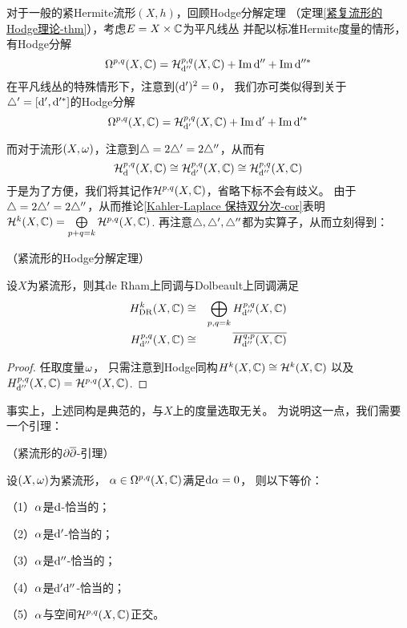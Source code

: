 对于一般的紧Hermite流形$(X,h)$，回顾Hodge分解定理
（定理\ref{紧复流形的Hodge理论-thm}），考虑$E=X\times\mathbb{C}$为平凡线丛
并配以标准Hermite度量的情形，有Hodge分解
$$
  \Omega^{p,q}(X,\mathbb{C})=
  \mathcal{H}^{p,q}_{\mathrm{d}''}(X,\mathbb{C})+\operatorname{Im}\mathrm{d}''+\operatorname{Im}\mathrm{d}''^*
$$
在平凡线丛的特殊情形下，注意到$(\mathrm{d}')^2=0$，
我们亦可类似得到关于$\triangle'=[\mathrm{d}',\mathrm{d}'^*]$的Hodge分解
$$
  \Omega^{p,q}(X,\mathbb{C})=
  \mathcal{H}^{p,q}_{\mathrm{d}'}(X,\mathbb{C})+\operatorname{Im}\mathrm{d}'+\operatorname{Im}\mathrm{d}'^*
$$

而对于\Kahler 流形$(X,\omega)$，注意到$\triangle=2\triangle'=2\triangle''$，从而有
$$
     \mathcal{H}^{p,q}_{\mathrm{d}}(X,\mathbb{C})
\cong\mathcal{H}^{p,q}_{\mathrm{d}'}(X,\mathbb{C})
\cong\mathcal{H}^{p,q}_{\mathrm{d}''}(X,\mathbb{C})
$$
于是为了方便，我们将其记作$\mathcal{H}^{p,q}(X,\mathbb{C})$，省略下标不会有歧义。
由于$\triangle=2\triangle'=2\triangle''$，从而推论\ref{Kahler-Laplace 保持双分次-cor}表明
$\mathcal{H}^{k}(X,\mathbb{C})=\bigoplus\limits_{p+q=k}\mathcal{H}^{p,q}(X,\mathbb{C})$.
再注意$\triangle,\triangle',\triangle''$都为实算子，从而立刻得到：

\begin{thm}（紧\Kahler 流形的Hodge分解定理）
\label{紧Kahler流形的Hodge分解-thm}

设$X$为紧\Kahler 流形，则其de Rham上同调与Dolbeault上同调满足
\begin{eqnarray*}
  H^k_{\operatorname{DR}}(X,\mathbb{C})&\cong&
  \bigoplus_{p,q=k}H^{p,q}_{\mathrm{d}''}(X,\mathbb{C})
\\
  H^{p,q}_{\mathrm{d}''}(X,\mathbb{C})&\cong&
  \overline{
  H^{q,p}_{\mathrm{d}''}(X,\mathbb{C})
  }
\end{eqnarray*}
\end{thm}

\begin{proof}
任取\Kahler 度量$\omega$，
只需注意到Hodge同构$H^k(X,\mathbb{C})\cong\mathcal{H}^k(X,\mathbb{C})$
以及$H^{p,q}_{\mathrm{d}''}(X,\mathbb{C})=\mathcal{H}^{p,q}(X,\mathbb{C})$.
\end{proof}

事实上，上述同构是典范的，与$X$上的\Kahler 度量选取无关。
为说明这一点，我们需要一个引理：

\begin{lemma}（紧\Kahler 流形的$\partial\overline{\partial}$-引理）
\label{紧Kahler流形的ppbar引理}

设$(X,\omega)$为紧\Kahler 流形，
$\alpha\in\Omega^{p,q}(X,\mathbb{C})$满足$\mathrm{d}\alpha=0$，
则以下等价：

（1）$\alpha$是$\mathrm{d}$-恰当的；

（2）$\alpha$是$\mathrm{d}'$-恰当的；

（3）$\alpha$是$\mathrm{d}''$-恰当的；

（4）$\alpha$是$\mathrm{d}'\mathrm{d}''$-恰当的；

（5）$\alpha$与空间$\mathcal{H}^{p,q}(X,\mathbb{C})$正交。
\end{lemma}

